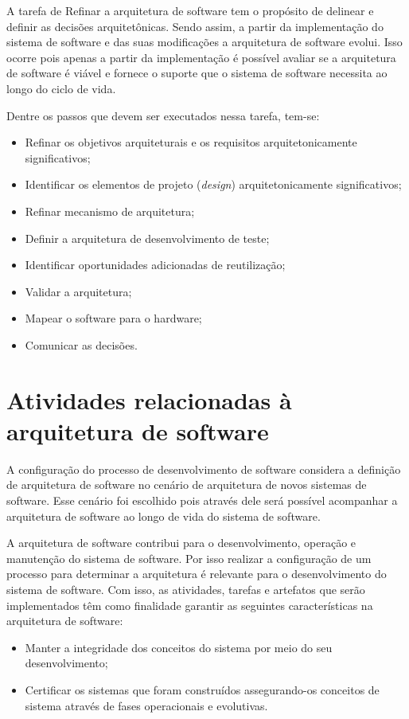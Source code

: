 A tarefa de Refinar a arquitetura de software tem o propósito de delinear e definir as decisões arquitetônicas. Sendo assim, a partir da implementação do sistema de software  e  das suas modificações a  arquitetura de software evolui. Isso ocorre pois apenas a partir da implementação é possível avaliar se a arquitetura de software é viável e fornece o suporte que o sistema de software necessita ao longo do ciclo de vida\cite{openup}.

Dentre os passos que devem ser executados nessa tarefa, tem-se\cite{openup}:

\begin{itemize}
    \item Refinar os objetivos arquiteturais e os requisitos arquitetonicamente significativos;
    \item Identificar os elementos de projeto (\emph{design}) arquitetonicamente significativos;
    \item Refinar mecanismo de arquitetura;
    \item Definir a arquitetura de desenvolvimento de teste;
    \item Identificar oportunidades adicionadas de reutilização;
    \item Validar a arquitetura;
    \item Mapear o software para o hardware;
    \item Comunicar as decisões.
\end{itemize}

\section{Atividades relacionadas à arquitetura de software}

A configuração do processo de desenvolvimento de software considera a definição de arquitetura de software no cenário de arquitetura de novos sistemas de software. Esse cenário foi escolhido pois através dele será possível acompanhar a arquitetura de software ao longo de vida do sistema de software\cite{ISO_1471}.

A arquitetura de software contribui para o desenvolvimento, operação e manutenção do sistema de software. Por isso realizar a configuração de um processo para determinar a arquitetura é relevante para o desenvolvimento do sistema de software. Com isso, as atividades, tarefas e artefatos que serão implementados têm como finalidade garantir as seguintes características na arquitetura de software\cite{ISO_1471}:
\begin{itemize}
    \item Manter a integridade dos conceitos do sistema por meio do seu desenvolvimento;
    \item Certificar os sistemas que foram construídos  assegurando-os conceitos de sistema através de fases operacionais e evolutivas.
\end{itemize}

